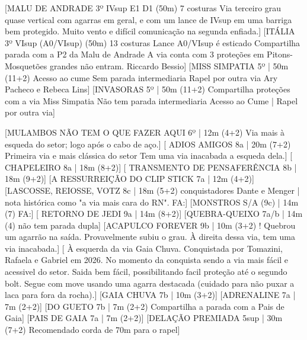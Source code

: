 \begin{CGSectorRoutes}
    [MALU DE ANDRADE 3º IVsup E1 D1 (50m) 7 costuras Via terceiro grau quase vertical com agarras em geral, e com um lance de IVsup em uma barriga bem protegido. Muito vento e difícil comunicação na segunda enfiada.]
    [ITÁLIA 3º VIsup (A0/VIsup) (50m) 13 costuras Lance A0/VIsup é esticado Compartilha parada com a P2 da Malu de Andrade A via conta com 3 proteções em Pitons-Mosquetões grandes não entram. Riccardo Bessio]
    [MISS SIMPATIA 5º | 50m (11+2) Acesso ao cume Sem parada intermediaria Rapel por outra via Ary Pacheco e Rebeca Lins]
    [INVASORAS 5º | 50m (11+2) Compartilha proteções com a via Miss Simpatia Não tem parada intermediaria Acesso ao Cume | 
Rapel por outra via]
\end{CGSectorRoutes}

\begin{CGSectorRoutes}
    [MULAMBOS NÃO TEM O
QUE FAZER AQUI 6º | 12m (4+2) Via mais à esqueda do setor; logo após o cabo de aço.]
    [ ADIOS AMIGOS 8a | 20m (7+2) Primeira via e mais clássica do setor Tem uma via inacabada a esqueda dela.]
    [ CHAPELEIRO 8a | 18m (8+2)]
    [ TRANSMENTO DE PENSAFERÊNCIA 8b | 18m (9+2)]
    [A RESSURREIÇÃO DO CLIP STICK 7a | 12m (4+2)]
    [LASCOSSE, REIOSSE, VOTZ 8c | 18m (5+2) conquistadores Dante e Menger | nota histórica como "a via mais cara do RN". FA:]
    [MONSTROS S/A (9c) | 14m (7) FA:]
    [ RETORNO DE JEDI 9a | 14m (8+2)]
    [QUEBRA-QUEIXO 7a/b | 14m (4) não tem parada dupla]
    [ACAPULCO FOREVER 9b | 10m (3+2) ! Quebrou um agarrão na saída. Provavelmente subiu o grau. À direita dessa via, tem uma via inacabada.]
    [ À esquerda da via Gaia Chuva. Conquistada por Tomazini, Rafaela e Gabriel em 2026. No momento da conquista sendo a via mais fácil e acessivel do setor. Saida bem fácil, possibilitando facil proteção até o segundo bolt. Segue com move usando uma agarra destacada (cuidado para não puxar a laca para fora da rocha).]
    [GAIA CHUVA 7b | 10m (3+2)]
    [ADRENALINE 7a | 7m (2+2)]
    [DO GUETO 7b | 7m (2+2) Compartilha a parada com a Pais de Gaia]
    [PAIS DE GAIA 7a | 7m (2+2)]
    [DELAÇÃO PREMIADA 5sup | 30m (7+2) Recomendado corda de 70m para o rapel]
\end{CGSectorRoutes}


